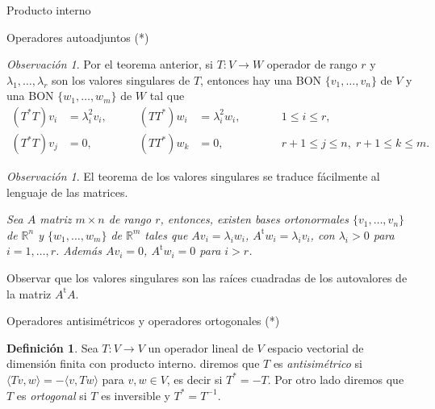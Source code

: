 \documentclass[a4paper,12pt,twoside,spanish,reqno]{amsbook}
\numberwithin{equation}{section}
\theoremstyle{definition}
\newtheorem{definicion}[teorema]{Definici\'on}
\theoremstyle{remark}
\newtheorem{obs}[teorema]{Observaci\'on}
\newtheorem*{obs*}{Observaci\'on}
\newcommand{\la}{\langle}
\newcommand{\ra}{\rangle}
\renewcommand{\t}{{\operatorname{t}}}
\newcommand{\R}{\mathbb R}
\begin{document}
\begin{chapter}{Producto interno}
\begin{section}{Operadores autoadjuntos (*)}
        \begin{obs}\label{tvs-matrices}
        Por  el teorema anterior, si $T: V \to W$ operador de rango $r$ y $\lambda_1,\ldots,\lambda_r$ son los valores singulares de $T$, entonces
        hay una BON  $\{v_1,\ldots,v_n\}$ de $V$ y una BON $\{w_1,\ldots,w_m\}$ de $W$ tal que
        \begin{align*}
            (T^*T)v_i &= \lambda_i^2 v_i,&\qquad (TT^*)w_i &= \lambda_i^2 w_i,& \qquad &1 \le i \le r, \\
            (T^*T)v_j &= 0,&\qquad (TT^*)w_k &= 0,& \qquad &r+1 \le j \le n,\; r+1 \le k \le m.
        \end{align*}
        \end{obs}
        
        \begin{obs*}
            El teorema de los valores singulares se traduce fácilmente al lenguaje de las matrices.
            
            \textit{Sea $A$ matriz $m \times n$ de rango $r$, entonces, existen bases ortonormales $\{v_1,\ldots,v_n\}$ de $\R^n$ y $\{w_1,\ldots,w_m\}$ de $\R^m$ tales que $Av_i = \lambda_i w_i$,  $A^{\t}w_i = \lambda_i v_i$, con $\lambda_i >0$ para $i=1,\ldots,r$. Además $Av_i = 0$,  $A^{\t}w_i = 0$ para $i > r$. }
            
            Observar que los valores singulares son las raíces cuadradas de los autovalores de la matriz $A^{\t}A$. 
        \end{obs*}
        
        
        
        
        \end{section}
        
        \begin{section}{Operadores antisimétricos y operadores ortogonales (*)}
            
        \begin{definicion}
            Sea $T:V\to V$ un operador lineal de $V$  espacio vectorial de dimensión finita con producto interno. diremos que $T$  es \textit{antisimétrico} si $\la Tv,w \ra = -\la v,Tw \ra$ para $v,w \in V$,  es decir si $T^* = -T$. Por otro lado diremos que $T$ es \textit{ortogonal} si $T$ es inversible y $T^* = T^{-1}$. 
        \end{definicion}	
        

\end{section}
\end{chapter}
\end{document}
